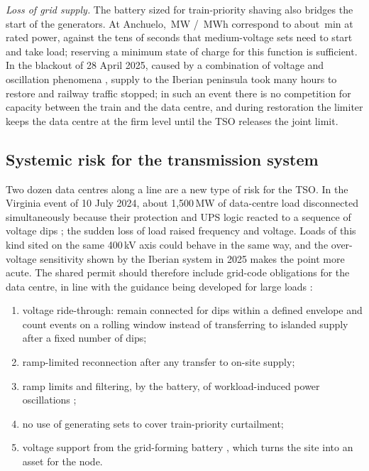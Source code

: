 \emph{Loss of grid supply.} The battery sized for train-priority shaving also bridges the start of the generators. At Anchuelo, \anBatMW\,MW / \anBatMWh\,MWh correspond to about \anBridgeMin\,min at rated power, against the tens of seconds that medium-voltage sets need to start and take load; reserving a minimum state of charge for this function is sufficient. In the blackout of 28 April 2025, caused by a combination of voltage and oscillation phenomena \cite{entsoe2026}, supply to the Iberian peninsula took many hours to restore and railway traffic stopped; in such an event there is no competition for capacity between the train and the data centre, and during restoration the limiter keeps the data centre at the firm level until the TSO releases the joint limit.

\subsection{Systemic risk for the transmission system}

Two dozen data centres along a line are a new type of risk for the TSO. In the Virginia event of 10 July 2024, about 1,500\,MW of data-centre load disconnected simultaneously because their protection and UPS logic reacted to a sequence of voltage dips \cite{nerc2025}; the sudden loss of load raised frequency and voltage. Loads of this kind sited on the same 400\,kV axis could behave in the same way, and the over-voltage sensitivity shown by the Iberian system in 2025 \cite{entsoe2026} makes the point more acute. The shared permit should therefore include grid-code obligations for the data centre, in line with the guidance being developed for large loads \cite{nerc2025}:
\begin{enumerate}
\item voltage ride-through: remain connected for dips within a defined envelope and count events on a rolling window instead of transferring to islanded supply after a fixed number of dips;
\item ramp-limited reconnection after any transfer to on-site supply;
\item ramp limits and filtering, by the battery, of workload-induced power oscillations \cite{li2024};
\item no use of generating sets to cover train-priority curtailment;
\item voltage support from the grid-forming battery \cite{lin2020}, which turns the site into an asset for the node.
\end{enumerate}

